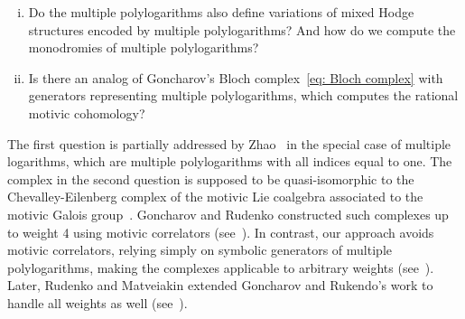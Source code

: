 \begin{question}\label{Fundamental questions}\hfill
\begin{enumerate}[i.]
\item Do the multiple polylogarithms also define variations of mixed Hodge structures encoded by multiple polylogarithms? And how do we compute the monodromies of multiple polylogarithms?
\item Is there an analog of Goncharov's Bloch complex~\eqref{eq: Bloch complex} with generators representing multiple polylogarithms, which computes the rational motivic cohomology?
\end{enumerate}
\end{question}

The first question is partially addressed by Zhao~\cite{Zhao_MultipleZetaFunctionsMultiplePolylogarithmsAndTheirSpecialValues} in the special case of multiple logarithms, which are multiple polylogarithms with all indices equal to one. The complex in the second question is supposed to be quasi-isomorphic to the Chevalley-Eilenberg complex of the motivic Lie coalgebra associated to the motivic Galois group~\cite{GoncharovMotivicGalois}. Goncharov and Rudenko constructed such complexes up to weight 4 using motivic correlators (see~\cite{GoncharovRudenko}). In contrast, our approach avoids motivic correlators, relying simply on symbolic generators of multiple polylogarithms, making the complexes applicable to arbitrary weights (see~\cite{ZDHZ_TheLieCoalgebraOfMultiplePolylogarithms}). Later, Rudenko and Matveiakin extended Goncharov and Rukendo's work to handle all weights as well (see~\cite{Rudenko_ClusterPolylogarithmsIQuadrangularPolylogarithms}). 


